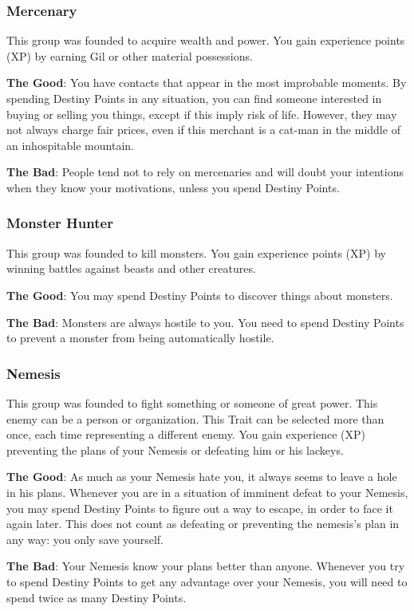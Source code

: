 \begin{multicols}{2}
\subsubsection{Mercenary}
This group was founded to acquire wealth and power. You gain experience points (XP) by earning Gil or other material possessions.

\textbf{The Good}: You have contacts that appear in the most improbable moments. By spending Destiny Points in any situation, you can find someone interested in buying or selling you things, except if this imply risk of life. However, they may not always charge fair prices, even if this merchant is a cat-man in the middle of an inhospitable mountain.

\textbf{The Bad}: People tend not to rely on mercenaries and will doubt your intentions when they know your motivations, unless you spend Destiny Points.

\subsubsection{Monster Hunter}
This group was founded to kill monsters. You gain experience points (XP) by winning battles against beasts and other creatures.

\textbf{The Good}: You may spend Destiny Points to discover things about monsters.

\textbf{The Bad}: Monsters are always hostile to you. You need to spend Destiny Points to prevent a monster from being automatically hostile.

\subsubsection{Nemesis}
This group was founded to fight something or someone of great power. This enemy can be a person or organization. This Trait can be selected more than once, each time representing a different enemy. You gain experience (XP) preventing the plans of your Nemesis or defeating him or his lackeys.

\textbf{The Good}: As much as your Nemesis hate you, it always seems to leave a hole in his plans. Whenever you are in a situation of imminent defeat to your Nemesis, you may spend Destiny Points to figure out a way to escape, in order to face it again later. This does not count as defeating or preventing the nemesis’s plan in any way: you only save yourself.

\textbf{The Bad}: Your Nemesis know your plans better than anyone. Whenever you try to spend Destiny Points to get any advantage over your Nemesis, you will need to spend twice as many Destiny Points.


\end{multicols}
